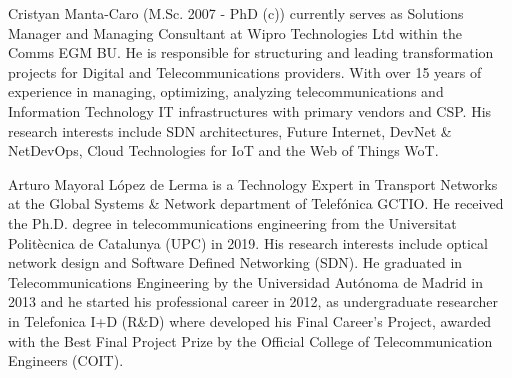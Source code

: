 \documentclass[10pt, conference]{IEEEtran}
\begin{document}
\begin{IEEEbiography}%
{Cristyan Manta-Caro} (M.Sc. 2007 - PhD (c)) currently serves as Solutions Manager and Managing Consultant at Wipro Technologies Ltd within the Comms EGM BU. He is responsible for structuring and leading transformation projects for Digital and Telecommunications providers. With over 15 years of experience in managing, optimizing, analyzing telecommunications and Information Technology IT infrastructures with primary vendors and CSP. His research interests include SDN architectures, Future Internet, DevNet \& NetDevOps, Cloud Technologies for IoT and the Web of Things WoT.\end{IEEEbiography}

\begin{IEEEbiography}%
{Arturo Mayoral López de Lerma} is a Technology Expert in Transport Networks at the Global Systems \& Network department of Telefónica GCTIO. He received the Ph.D. degree in telecommunications engineering from the Universitat Politècnica de Catalunya (UPC) in 2019. His  research  interests  include  optical network design and Software Defined Networking (SDN). He graduated in Telecommunications Engineering by the Universidad Autónoma de Madrid in 2013 and he started his professional career in 2012, as undergraduate researcher in Telefonica I+D (R\&D) where developed his Final Career’s Project, awarded with the Best Final Project Prize by the Official College of Telecommunication Engineers (COIT).\end{IEEEbiography}
\end{document}
